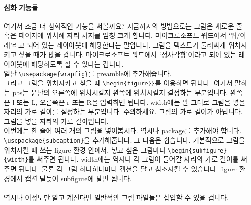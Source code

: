 \paragraph{심화 기능들}
여기서 조금 더 심화적인 기능을 써볼까요?
지금까지의 방법으로는 그림은 새로운 줄 혹은 페이지에 위치해 자리 차지를 엄청 크게 합니다.
마이크로소프트 워드에서 `위/아래'라고 되어 있는 레이아웃에 해당한다는 말입니다.
그림을 텍스트가 둘러싸게 위치시키고 싶을 때가 많을 겁니다.
마이크로소프트 워드에서 `정사각형'이라고 되어 있는 레이아웃에 해당하도록 할 수 있다는 겁니다.\\
일단 \verb|\usepackage{wrapfig}|를 preamble에 추가해줍니다.\\
그리고 그림을 위치시키고 싶을 때 \verb|\begin{figure}}|를 이용하면 됩니다.
여기서 말하는 pos는 문단의 오른쪽에 위치시킬지 왼쪽에 위치시킬지 결정하는 부분입니다.
왼쪽은 l 또는 L, 오른쪽은 r 또는 R을 입력하면 됩니다.
width에는 말 그대로 그림을 넣을 자리의 가로 길이를 설정하는 부분입니다.
주의하세요. 그림의 가로 길이가 아닙니다.
그림을 넣을 자리의 가로 길이입니다.\\
이번에는 한 줄에 여러 개의 그림을 넣어봅시다.
역시나 package를 추가해야 합니다.\\
\verb|\usepackage{subcaption}|을 추가해줍니다.
그 다음은 쉽습니다.
기본적으로 그림을 위치시킬 때 쓰는 figure 환경 안에서, 넣고 싶은 그림마다 \verb|\begin{subfigure}{width}|를 써주면 됩니다.
width에는 역시나 각 그림이 들어갈 자리의 가로 길이를 써주면 됩니다.
물론 각 그림 하나하나마다 캡션을 달고 참조시킬 수 있습니다.
figure 환경에서 캡션 달듯이 subfigure에 달면 됩니다.

\paragraph{}
역시나 이정도만 알고 계신다면 일반적인 그림 파일들은 삽입할 수 있을 겁니다.

